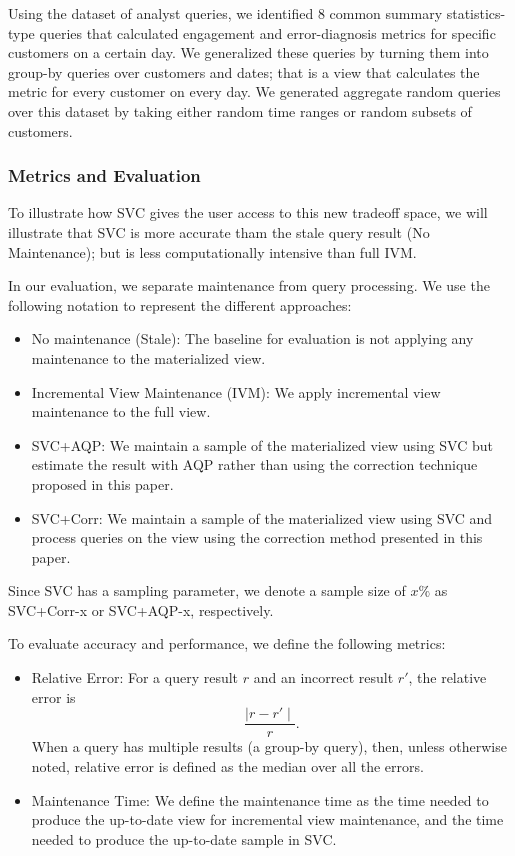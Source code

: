 Using the dataset of analyst queries, we identified 8 common summary statistics-type queries that calculated engagement and error-diagnosis metrics for specific customers on a certain day.
We generalized these queries by turning them into group-by queries over customers and dates; that is a view that calculates the metric for every customer on every day.
We generated aggregate random queries over this dataset by taking either random time ranges or random subsets of customers.

\subsubsection{Metrics and Evaluation}
To illustrate how SVC gives the user access to this new tradeoff space, we will illustrate that SVC is more accurate tham the stale query result (No Maintenance); but is less computationally intensive than full IVM. 

In our evaluation, we separate maintenance from query processing.
We use the following notation to represent the different approaches:
\begin{itemize}
\item No maintenance (Stale): The baseline for evaluation is not applying any maintenance to the materialized view.
\item Incremental View Maintenance (IVM): We apply incremental view maintenance to the full view.
\item SVC+AQP: We maintain a sample of the materialized view using SVC but estimate the result with AQP rather than using 
the correction technique proposed in this paper.
\item SVC+Corr: We maintain a sample of the materialized view using SVC and process queries on the view using the correction method presented in this paper.
\end{itemize}
Since SVC has a sampling parameter, we denote a sample size of $x \% $ as SVC+Corr-x or SVC+AQP-x, respectively. 

To evaluate accuracy and performance, we define the following metrics:
\begin{itemize}
\item Relative Error: For a query result $r$ and an incorrect result $r'$, the relative error is \[\frac{\mid r-r' \mid}{r}.\] 
When a query has multiple results (a group-by query), then, unless otherwise noted, relative error is defined as the median over all the errors.
\item Maintenance Time: We define the maintenance time as the time needed to produce the up-to-date view for incremental view maintenance, and the time needed to produce the up-to-date sample in SVC. 
\end{itemize}

